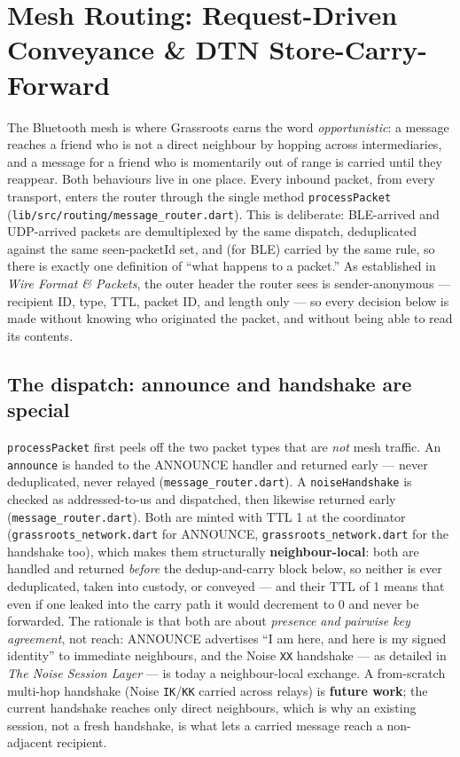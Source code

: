 \documentclass[11pt]{report}
\newcommand{\code}[1]{\texttt{\small #1}}
\begin{document}
\section{Mesh Routing: Request-Driven Conveyance \& DTN Store-Carry-Forward}

The Bluetooth mesh is where Grassroots earns the word \emph{opportunistic}: a message reaches a friend who is not a direct neighbour by hopping across intermediaries, and a message for a friend who is momentarily out of range is carried until they reappear. Both behaviours live in one place. Every inbound packet, from every transport, enters the router through the single method \code{processPacket} (\code{lib/src/routing/message\_router.dart}). This is deliberate: BLE-arrived and UDP-arrived packets are demultiplexed by the same dispatch, deduplicated against the same seen-packetId set, and (for BLE) carried by the same rule, so there is exactly one definition of ``what happens to a packet.'' As established in \emph{Wire Format \& Packets}, the outer header the router sees is sender-anonymous — recipient ID, type, TTL, packet ID, and length only — so every decision below is made without knowing who originated the packet, and without being able to read its contents.

\subsection*{The dispatch: announce and handshake are special}

\code{processPacket} first peels off the two packet types that are \emph{not} mesh traffic. An \code{announce} is handed to the ANNOUNCE handler and returned early — never deduplicated, never relayed (\code{message\_router.dart}). A \code{noiseHandshake} is checked as addressed-to-us and dispatched, then likewise returned early (\code{message\_router.dart}). Both are minted with TTL 1 at the coordinator (\code{grassroots\_network.dart} for ANNOUNCE, \code{grassroots\_network.dart} for the handshake too), which makes them structurally \textbf{neighbour-local}: both are handled and returned \emph{before} the dedup-and-carry block below, so neither is ever deduplicated, taken into custody, or conveyed --- and their TTL of 1 means that even if one leaked into the carry path it would decrement to 0 and never be forwarded. The rationale is that both are about \emph{presence and pairwise key agreement}, not reach: ANNOUNCE advertises ``I am here, and here is my signed identity'' to immediate neighbours, and the Noise \code{XX} handshake — as detailed in \emph{The Noise Session Layer} — is today a neighbour-local exchange. A from-scratch multi-hop handshake (Noise \code{IK}/\code{KK} carried across relays) is \textbf{future work}; the current handshake reaches only direct neighbours, which is why an existing session, not a fresh handshake, is what lets a carried message reach a non-adjacent recipient.
\end{document}
